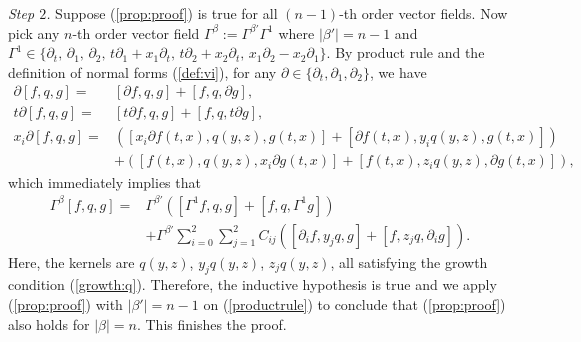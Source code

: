 \documentclass[12pt]{amsart}
\numberwithin{equation}{section} \numberwithin{theorem}{section}
\numberwithin{example}{section} \numberwithin{remark}{section}
\numberwithin{figure}{section} \numberwithin{algorithm}{section}
\def\be{\begin{equation}}
\def\ee{\end{equation}}
\def\pa{\partial}
\def\Gb{\Gamma^{\beta}}
\begin{document}
\emph{Step $2$.} Suppose (\ref{prop:proof}) is true for all $(n-1)$-th order
vector fields. Now pick any $n$-th order vector field
$\Gb:=\Gamma^{\beta'}\Gamma^1$ where $|\beta'|=n-1$ and
$\Gamma^1\in\{\pa_t,\,\pa_1,\,\pa_2,\,t\pa_1+x_1\pa_t,\,t\pa_2+x_2\pa_t,
\,x_1\pa_2-x_2\pa_1\}$. By product rule and the definition of normal
forms (\ref{def:vi}), for any $\pa\in\{\pa_t,\pa_1,\pa_2\}$,
we have
\[
\begin{split}\pa[f,q,g]=&[\pa f,q,g]+[f,q,\pa g],\\
t\pa[f,q,g]=&[t\pa f,q,g]+[f,q,t\pa g],\\
x_i\pa[f,q,g]=&\left([x_i\pa f(t,x),q(y,z),g(t,x)]
+[\pa f(t,x),y_iq(y,z),g(t,x)]\right)\\
&+\left([f(t,x),q(y,z),x_i\pa g(t,x)]+[f(t,x),z_iq(y,z),\pa g(t,x)]\right),
\end{split}
\]
which immediately implies that
\be\label{productrule}
\begin{split}\Gb[f,q,g]=&\Gamma^{\beta'}\left([\Gamma^1 f,q,g]
+[f,q,\Gamma^1g]\right)\\ &+\Gamma^{\beta'}\sum_{i=0}^2
\sum_{j=1}^2C_{ij}\left([\pa_if,y_jq,g]+[f,z_jq,\pa_ig]\right).
\end{split}
\ee Here, the kernels are $q(y,z)$, $y_jq(y,z)$, $z_jq(y,z)$, all
satisfying the growth condition (\ref{growth:q}). Therefore, the
inductive hypothesis is true and we apply (\ref{prop:proof}) with
$|\beta'|=n-1$ on (\ref{productrule}) to conclude that
(\ref{prop:proof}) also holds for $|\beta|=n$. This finishes the proof.
\end{document}
